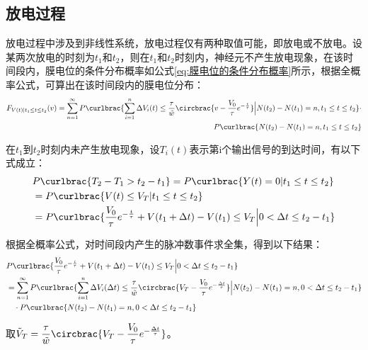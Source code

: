\documentclass[11pt]{article}
\begin{document}
\subsection{放电过程}
放电过程中涉及到非线性系统，放电过程仅有两种取值可能，即放电或不放电。设某两次放电的时刻为$t_1$和$t_2$，则在$t_1$和$t_2$时刻内，神经元不产生放电现象，在该时间段内，膜电位的条件分布概率如公式\ref{eq:膜电位的条件分布概率}所示，根据全概率公式，可算出在该时间段内的膜电位分布：
\begin{align}
  \begin{aligned}
    F_{V(t)|t_1\le t\le t_2}(v)=    \sum_{n=1}^{\infty}P\curlbrac{\sum_{i=1}^{n}\Delta V_i(t)\le \frac{\tau}{\tilde{w}}\circbrac{v-\frac{V_0}{\tau}e^{-\frac{t}{\tau}}}\Big| N(t_2)-N(t_1)=n,t_1\le t\le t_2}\cdot \\
    P\curlbrac{ N(t_2)-N(t_1)=n,t_1\le t\le t_2}
  \end{aligned}
\end{align}\par
在$t_1$到$t_2$时刻内未产生放电现象，设$T_i(t)$表示第i个输出信号的到达时间，有以下式成立：
\begin{align*}
   & P\curlbrac{T_2-T_{1}>t_2-t_1}=P\curlbrac{Y(t)=0|t_1\le t\le t_2}                                                      \\
   & =  P\curlbrac{V(t)\le V_T|t_1\le t\le t_2}                                                                \\
   & = P\curlbrac{\frac{V_0}{\tau}e^{-\frac{t}{\tau}}+V(t_1+\Delta t)-V(t_1)\le V_T\Big|0<\Delta t\le t_2-t_1}
\end{align*}\par
根据全概率公式，对时间段内产生的脉冲数事件求全集，得到以下结果：
\begin{align}
  \begin{aligned}
     & P\curlbrac{\frac{V_0}{\tau}e^{-\frac{t}{\tau}}+V(t_1+\Delta t)-V(t_1)\le V_T\Big|0<\Delta t\le t_2-t_1} \\
     &=\sum_{n=1}^{\infty}P\curlbrac{\sum_{i=1}^{n}\Delta V_i(\Delta t)\le \frac{\tau}{\tilde{w}}\circbrac{V_T-\frac{V_0}{\tau}e^{-\frac{\Delta t}{\tau}}}\Big| N(t_2)-N(t_1)=n,0<\Delta t\le t_2-t_1}\\
     & \quad\cdot  P\curlbrac{ N(t_2)-N(t_1)=n,0<\Delta t\le t_2-t_1}                                                 
  \end{aligned}
  \label{eq:放电过程等价事件全集}
\end{align}\par
取$\displaystyle \tilde{V}_T= \frac{\tau}{\tilde{w}}\circbrac{V_T-\frac{V_0}{\tau}e^{-\frac{\Delta t}{\tau}}}$。
\end{document}
